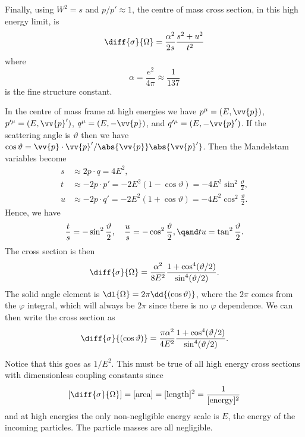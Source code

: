 \documentclass[fleqn]{NotesClass}
\begin{document}
    Finally, using \(W^2 = s\) and \(p/p' \approx 1\), the centre of mass cross section, in this high energy limit, is
    \begin{equation}
        \diff{\sigma}{\Omega} = \frac{\alpha^2}{2s} \frac{s^2 + u^2}{t^2}
    \end{equation}
    where
    \begin{equation}
        \alpha = \frac{e^2}{4\pi} \approx \frac{1}{137}
    \end{equation}
    is the fine structure constant.
    
    In the centre of mass frame at high energies we have \(p^\mu = (E, \vv{p})\), \(p'^\mu = (E, \vv{p}')\), \(q^\mu = (E, -\vv{p})\), and \(q'^\mu = (E, -\vv{p}')\).
    If the scattering angle is \(\vartheta\) then we have \(\cos\vartheta = \vv{p} \cdot \vv{p}'/\abs{\vv{p}} \abs{\vv{p}'}\).
    Then the Mandelstam variables become
    \begin{align}
        s &\approx 2 p \cdot q = 4E^2,\\
        t &\approx -2p \cdot p' = -2E^2(1 - \cos\vartheta) = -4E^2\sin^2 \frac{\vartheta}{2},\\
        u &\approx -2p \cdot q' = -2E^2(1 + \cos\vartheta) = -4E^2\cos^2 \frac{\vartheta}{2}.
    \end{align}
    Hence, we have
    \begin{equation}
        \frac{t}{s} = -\sin^2\frac{\vartheta}{2}, \quad \frac{u}{s} = - \cos^2\frac{\vartheta}{2}, \qand tu = \tan^2\frac{\vartheta}{2}.
    \end{equation}
    The cross section is then
    \begin{equation}
        \diff{\sigma}{\Omega} = \frac{\alpha^2}{8E^2} \frac{1 + \cos^4 (\vartheta/2)}{\sin^4(\vartheta/2)}.
    \end{equation}
    The solid angle element is \(\dl{\Omega} = 2\pi \dd{(\cos\vartheta)}\), where the \(2\pi\) comes from the \(\varphi\) integral, which will always be \(2\pi\) since there is no \(\varphi\) dependence.
    We can then write the cross section as
    \begin{equation}
        \diff{\sigma}{(\cos\vartheta)} = \frac{\pi\alpha^2}{4E^2} \frac{1 + \cos^4(\vartheta/2)}{\sin^4(\vartheta/2)}.
    \end{equation}
    
    Notice that this goes as \(1/E^2\).
    This must be true of all high energy cross sections with dimensionless coupling constants since
    \begin{equation}
        \left[ \diff{\sigma}{\Omega} \right] = [\text{area}] = [\text{length}]^2 = \frac{1}{[\text{energy}]^2}
    \end{equation}
    and at high energies the only non-negligible energy scale is \(E\), the energy of the incoming particles.
    The particle masses are all negligible.
    
\end{document}
